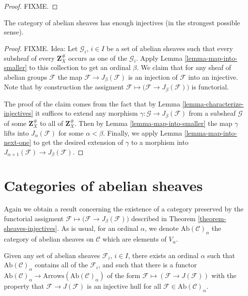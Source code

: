 \begin{proof}
FIXME.
\end{proof}

\begin{theorem}
\label{theorem-sheaves-injectives}
The category of abelian sheaves has enough injectives (in the
strongest possible sense).
\end{theorem}

\begin{proof}
FIXME. Idea: Let $\mathcal{G}_i$, $i\in I$ be a set of abelian
sheaves such that every subsheaf of every $\mathbf{Z}_X^\#$
occurs as one of the $\mathcal{G}_i$. Apply
Lemma \ref{lemma-map-into-smaller} to this collection to
get an ordinal $\beta$. We claim that for any sheaf of abelian
groups $\mathcal{F}$ the map $\mathcal{F} \to J_\beta(\mathcal{F})$
is an injection of $\mathcal{F}$ into an injective.
Note that by construction the assigment $\mathcal{F} \mapsto
\big(\mathcal{F} \to J_\beta(\mathcal{F})\big)$ is functorial.

\medskip\noindent
The proof of the claim comes from the fact that by
Lemma \ref{lemma-characterize-injectives} it suffices to extend any
morphism $\gamma : \mathcal{G} \to J_\beta(\mathcal{F})$ 
from a subsheaf $\mathcal{G}$ of some $\mathbf{Z}_X^\#$ to all of
$\mathbf{Z}_X^\#$. Then by Lemma \ref{lemma-map-into-smaller} the
map $\gamma$ lifts into $J_\alpha(\mathcal{F})$ for some
$\alpha < \beta$. Finally, we apply Lemma \ref{lemma-map-into-next-one}
to get the desired extension of $\gamma$ to a morphism
into $J_{\alpha+1}(\mathcal{F}) \to J_\beta(\mathcal{F})$.
\end{proof}

\section{Categories of abelian sheaves}
\label{section-abelian-sheaves}

\noindent
Again we obtain a result concerning the existence of a category 
preserved by the functorial assigment $\mathcal{F} \mapsto
\big(\mathcal{F} \to J_\beta(\mathcal{F})\big)$ described in
Theorem \ref{theorem-sheaves-injectives}. As is usual, for an
ordinal $\alpha$, we denote $\text{Ab}(\mathcal{C})_\alpha$ the
category of abelian sheaves on $\mathcal{C}$ which are elements
of $V_\alpha$.

\begin{lemma}
\label{lemma-injective-sheaf-preserves-category}
Given any set of abelian sheaves $\mathcal{F}_i$, $i\in I$, there
exists an ordinal $\alpha$ such that $\text{Ab}(\mathcal{C})_\alpha$
contains all of the $\mathcal{F}_i$, and such that there is a functor
$\text{Ab}(\mathcal{C})_\alpha \to
\text{Arrows}(\text{Ab}(\mathcal{C})_\alpha)$
of the form $\mathcal{F} \mapsto (\mathcal{F} \to J(\mathcal{F}))$
with the property that $\mathcal{F} \to J(\mathcal{F})$ is an injective
hull for all $\mathcal{F} \in \text{Ab}(\mathcal{C})_\alpha$.
\end{lemma}

